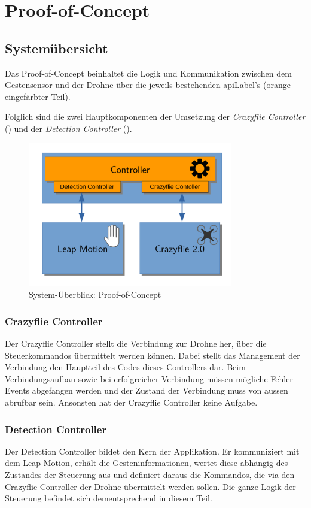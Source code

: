 \chapter{Proof-of-Concept}

\section{Systemübersicht}
Das Proof-of-Concept beinhaltet die Logik und Kommunikation zwischen dem Gestensensor und der Drohne über die jeweils bestehenden \gls{apiLabel}'s (orange eingefärbter Teil).

Folglich sind die zwei Hauptkomponenten der Umsetzung der \textit{Crazyflie Controller} () und der \textit{Detection Controller} ().

\begin{figure}[H]
	\centering
	\includegraphics[width=0.8\textwidth]{figures/system_poc.pdf}
	\caption{System-Überblick: Proof-of-Concept}
\end{figure}

\subsection{Crazyflie Controller}
\label{sec:poc:controllerCrazyflie}
Der Crazyflie Controller stellt die Verbindung zur Drohne her, über die Steuerkommandos übermittelt werden können.
Dabei stellt das Management der Verbindung den Hauptteil des Codes dieses Controllers dar.
Beim Verbindungsaufbau sowie bei erfolgreicher Verbindung müssen mögliche Fehler-Events abgefangen werden und der Zustand der Verbindung muss von aussen abrufbar sein.
Ansonsten hat der Crazyflie Controller keine Aufgabe.

\subsection{Detection Controller}
\label{sec:poc:controllerDetection}
Der Detection Controller bildet den Kern der Applikation. Er kommuniziert mit dem Leap Motion, erhält die Gesteninformationen, wertet diese abhängig des Zustandes der Steuerung aus und definiert daraus die Kommandos, die via den Crazyflie Controller der Drohne übermittelt werden sollen.
Die ganze Logik der Steuerung befindet sich dementsprechend in diesem Teil.

